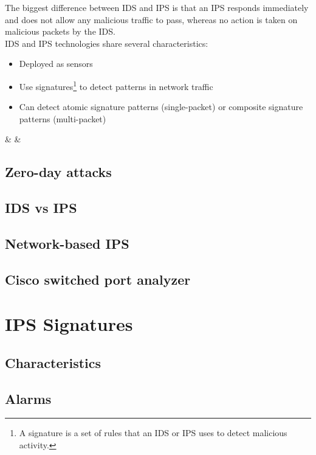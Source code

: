 The biggest difference between IDS and IPS is that an IPS responds immediately and does not allow any malicious traffic to pass, whereas no action is taken on malicious packets by the IDS.\\

IDS and IPS technologies share several characteristics:

\begin{itemize}
\item Deployed as sensors
\item Use signatures\footnote{A signature is a set of rules that an IDS or IPS uses to detect malicious activity.} to detect patterns in network traffic
\item Can detect atomic signature patterns (single-packet) or composite signature patterns (multi-packet)
\end{itemize}

&  & \w
{}
\tableEnd

\subsection{Zero-day attacks}

\subsection{IDS vs IPS}

\subsection{Network-based IPS}

\subsection{Cisco switched port analyzer}

\section{IPS Signatures}

\subsection{Characteristics}

\subsection{Alarms}

